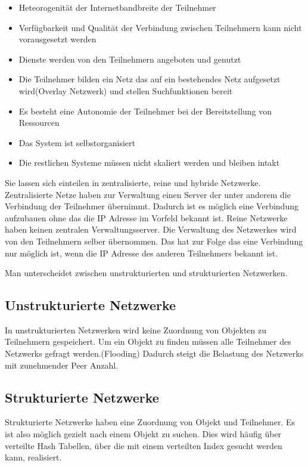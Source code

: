 \begin{itemize}
  \item Heteorogenität der Internetbandbreite der Teilnehmer
  \item Verfügbarkeit und Qualität der Verbindung zwischen Teilnehmern kann nicht vorausgesetzt werden
  \item Dienste werden von den Teilnehmern angeboten und genutzt
  \item Die Teilnehmer bilden ein Netz das auf ein bestehendes Netz aufgesetzt wird(Overlay Netzwerk) und stellen Suchfunktionen bereit
  \item Es besteht eine Autonomie der Teilnehmer bei der Bereitstellung von Ressourcen
  \item Das System ist selbstorganisiert
  \item Die restlichen Systeme müssen nicht skaliert werden und bleiben intakt
\end{itemize}
Sie lassen sich einteilen in zentralisierte, reine und hybride \pTp Netzwerke. Zentralisierte Netze haben zur Verwaltung einen Server der unter anderem die Verbindung der Teilnehmer übernimmt. Dadurch ist es möglich eine Verbindung aufzubauen ohne das die IP Adresse im Vorfeld bekannt ist. Reine \pTp Netzwerke haben keinen zentralen Verwaltungsserver. Die Verwaltung des Netzwerkes wird von den Teilnehmern selber übernommen. Das hat zur Folge das eine Verbindung nur möglich ist, wenn die IP Adresse des anderen Teilnehmers bekannt ist. 

Man unterscheidet zwischen unstrukturierten und strukturierten \pTp Netzwerken. 

\subsection{Unstrukturierte \pTp Netzwerke}
In unstrukturierten \pTp Netzwerken wird keine Zuordnung von Objekten zu Teilnehmern gespeichert. Um ein Objekt zu finden müssen alle Teilnehmer des Netzwerks gefragt werden.(Flooding) Dadurch steigt die Belastung des Netzwerks mit zunehmender Peer Anzahl.

\subsection{Strukturierte \pTp Netzwerke}
Strukturierte \pTp Netzwerke haben eine Zuordnung von Objekt und Teilnehmer. Es ist also möglich gezielt nach einem Objekt zu suchen. Dies wird häufig über verteilte Hash Tabellen, über die mit einem verteilten Index gesucht werden kann, realisiert.


